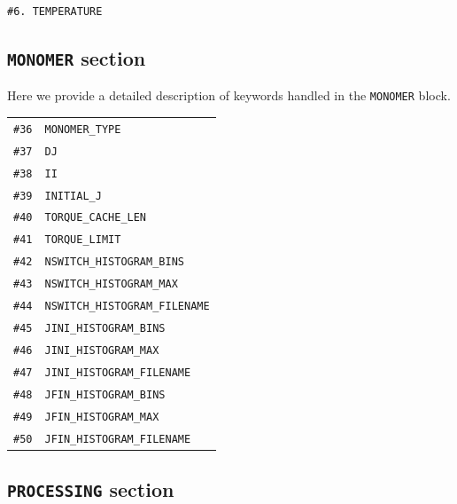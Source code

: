 \documentclass[color]{article}
\begin{document}
\noindent
\texttt{\#6. TEMPERATURE}

\subsection{\texttt{MONOMER} section}
\label{subsec:monomer-section}

Here we provide a detailed description of keywords handled in the \texttt{MONOMER} block.

\begin{table}[H]
  \begin{tabular}{ll}
    \texttt{\#36} & \texttt{MONOMER\_TYPE} \\
    \texttt{\#37} & \texttt{DJ} \\
    \texttt{\#38} & \texttt{II} \\
    \texttt{\#39} & \texttt{INITIAL\_J} \\
    \texttt{\#40} & \texttt{TORQUE\_CACHE\_LEN} \\
    \texttt{\#41} & \texttt{TORQUE\_LIMIT} \\
    \texttt{\#42} & \texttt{NSWITCH\_HISTOGRAM\_BINS} \\
    \texttt{\#43} & \texttt{NSWITCH\_HISTOGRAM\_MAX} \\
    \texttt{\#44} & \texttt{NSWITCH\_HISTOGRAM\_FILENAME} \\
    \texttt{\#45} & \texttt{JINI\_HISTOGRAM\_BINS} \\
    \texttt{\#46} & \texttt{JINI\_HISTOGRAM\_MAX} \\
    \texttt{\#47} & \texttt{JINI\_HISTOGRAM\_FILENAME} \\
    \texttt{\#48} & \texttt{JFIN\_HISTOGRAM\_BINS} \\
    \texttt{\#49} & \texttt{JFIN\_HISTOGRAM\_MAX} \\
    \texttt{\#50} & \texttt{JFIN\_HISTOGRAM\_FILENAME} \\
  \end{tabular}
\end{table}

\subsection{\texttt{PROCESSING} section}
\label{subsec:processing-section}
\end{document}
